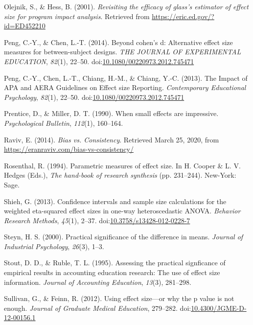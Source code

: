 \documentclass[
  man,floatsintext]{apa6}
\begin{document}
\leavevmode\hypertarget{ref-Olejnik_Hess_2001}{}%
Olejnik, S., \& Hess, B. (2001). \emph{Revisiting the efficacy of glass's estimator of effect size for program impact analysis}. Retrieved from \url{https://eric.ed.gov/?id=ED452210}

\leavevmode\hypertarget{ref-Peng_and_Chen_2014}{}%
Peng, C.-Y., \& Chen, L.-T. (2014). Beyond cohen's d: Alternative effect size measures for between-subject designs. \emph{THE JOURNAL OF EXPERIMENTAL EDUCATION}, \emph{82}(1), 22--50. doi:\href{https://doi.org/10.1080/00220973.2012.745471}{10.1080/00220973.2012.745471}

\leavevmode\hypertarget{ref-Peng_et_al_2013}{}%
Peng, C.-Y., Chen, L.-T., Chiang, H.-M., \& Chiang, Y.-C. (2013). The Impact of APA and AERA Guidelines on Effect size Reporting. \emph{Contemporary Educational Psychology}, \emph{82}(1), 22--50. doi:\href{https://doi.org/10.1080/00220973.2012.745471}{10.1080/00220973.2012.745471}

\leavevmode\hypertarget{ref-Prentice_Miller_1992}{}%
Prentice, D., \& Miller, D. T. (1990). When small effects are impressive. \emph{Psychological Bulletin}, \emph{112}(1), 160--164.

\leavevmode\hypertarget{ref-Raviv}{}%
Raviv, E. (2014). \emph{Bias vs. Consistency}. Retrieved March 25, 2020, from \url{https://eranraviv.com/bias-vs-consistency/}

\leavevmode\hypertarget{ref-Rosenthal_1994}{}%
Rosenthal, R. (1994). Parametric measures of effect size. In H. Cooper \& L. V. Hedges (Eds.), \emph{The hand-book of research synthesis} (pp. 231--244). New-York: Sage.

\leavevmode\hypertarget{ref-Shieh_2013}{}%
Shieh, G. (2013). Confidence intervals and sample size calculations for the weighted eta-squared effect sizes in one-way heteroscedastic ANOVA. \emph{Behavior Research Methods}, \emph{45}(1), 2--37. doi:\href{https://doi.org/10.3758/s13428-012-0228-7}{10.3758/s13428-012-0228-7}

\leavevmode\hypertarget{ref-Steyn_2000}{}%
Steyn, H. S. (2000). Practical significance of the difference in means. \emph{Journal of Industrial Psychology}, \emph{26}(3), 1--3.

\leavevmode\hypertarget{ref-Stout_Ruble_1995}{}%
Stout, D. D., \& Ruble, T. L. (1995). Assessing the practical signficance of empirical results in accounting education research: The use of effect size information. \emph{Journal of Accounting Education}, \emph{13}(3), 281--298.

\leavevmode\hypertarget{ref-Sullivan_Feinn_2012}{}%
Sullivan, G., \& Feinn, R. (2012). Using effect size---or why the p value is not enough. \emph{Journal of Graduate Medical Education}, 279--282. doi:\href{https://doi.org/10.4300/JGME-D-12-00156.1}{10.4300/JGME-D-12-00156.1}
\end{document}
